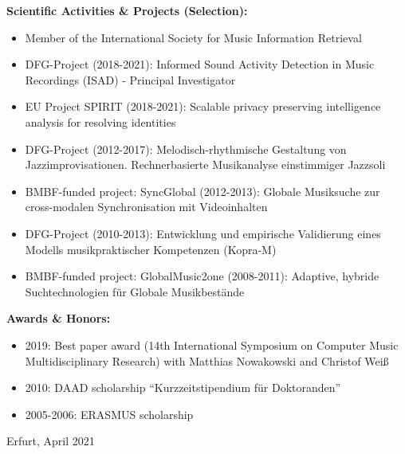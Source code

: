 \documentclass[8pt,a4paper]{article}
\newenvironment{itemizePacked}{
\begin{itemize}
  \setlength{\itemsep}{1pt}
  \setlength{\parskip}{3pt}
  \setlength{\parsep}{0pt}
  \renewcommand{\labelitemi}{$\bullet$}
}{\end{itemize}}
\begin{document}
{\bf Scientific Activities \& Projects (Selection):}
\begin{itemizePacked}
\item Member of the International Society for Music Information Retrieval %
\item DFG-Project (2018-2021): Informed Sound Activity Detection in Music Recordings (ISAD) - Principal Investigator
\item EU Project SPIRIT (2018-2021): Scalable privacy preserving intelligence analysis for resolving identities
\item DFG-Project (2012-2017): Melodisch-rhythmische Gestaltung von Jazzimprovisationen. Rechnerbasierte Musikanalyse einstimmiger Jazzsoli
\item BMBF-funded project: SyncGlobal (2012-2013): Globale Musiksuche zur cross-modalen Synchronisation mit Videoinhalten
\item DFG-Project (2010-2013): Entwicklung und empirische Validierung eines Modells musikpraktischer Kompetenzen (Kopra-M)
\item BMBF-funded project: GlobalMusic2one (2008-2011): Adaptive, hybride Suchtechnologien f{\"u}r Globale Musikbest{\"a}nde
\end{itemizePacked}

\vspace*{0.2cm}

{\bf Awards \& Honors:}
\begin{itemizePacked}
\item 2019: Best paper award (14th International Symposium on Computer Music Multidisciplinary Research) with Matthias Nowakowski and Christof Wei\ss
\item 2010: DAAD scholarship ``Kurzzeitstipendium f{\"u}r Doktoranden''
\item 2005-2006: ERASMUS scholarship
\end{itemizePacked}



\vspace{1cm}

Erfurt, April 2021
\end{document}
